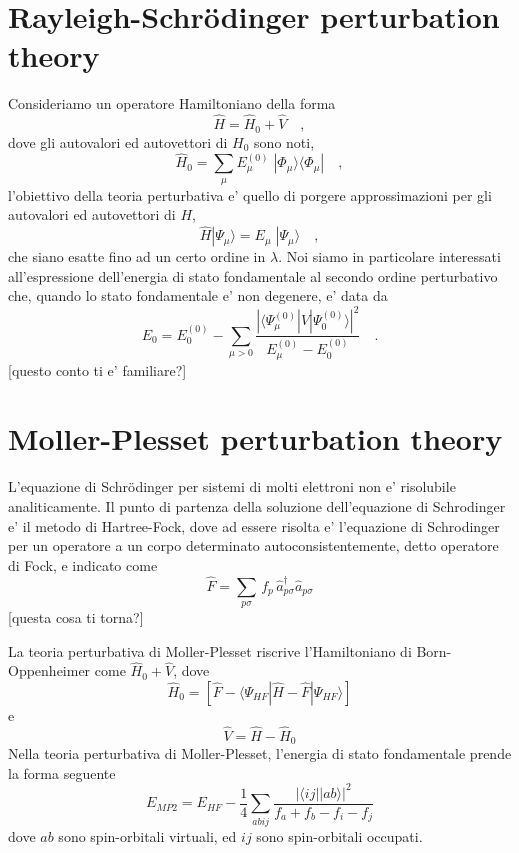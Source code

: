\documentclass{report}
\begin{document}
\section{Rayleigh-Schr\"{o}dinger perturbation theory}

Consideriamo un operatore Hamiltoniano della forma
\begin{equation}
\hat{H} = \hat{H}_0 + \hat{V}
\quad,
\end{equation}
dove gli autovalori ed autovettori di $H_0$ sono noti,
\begin{equation}
\hat{H}_0 = \sum_\mu E^{(0)}_{\mu} \; | \Phi_\mu \rangle \langle \Phi_\mu |
\quad,
\end{equation}
l'obiettivo della teoria perturbativa e' quello di porgere approssimazioni per gli autovalori ed autovettori di $H$,
\begin{equation}
\hat{H} | \Psi_\mu \rangle = E_\mu \; | \Psi_\mu \rangle
\quad,
\end{equation}
che siano esatte fino ad un certo ordine in $\lambda$. 
Noi siamo in particolare interessati all'espressione dell'energia di stato fondamentale al secondo ordine perturbativo che,
quando lo stato fondamentale e' non degenere, e' data da 
\begin{equation}
E_0 = E^{(0)}_{0} - \sum_{\mu>0} \frac{ | \langle \Psi_\mu^{(0)} | \hat{V} | \Psi_0^{(0)} \rangle |^2 }{ E^{(0)}_{\mu} - E^{(0)}_{0} }
\quad.
\end{equation}
[questo conto ti e' familiare?]

\section{Moller-Plesset perturbation theory}

L'equazione di Schr\"{o}dinger per sistemi di molti elettroni non e' risolubile analiticamente. 
Il punto di partenza della soluzione dell'equazione di Schrodinger e' il metodo di Hartree-Fock, dove ad essere risolta e'
l'equazione di Schrodinger per un operatore a un corpo determinato autoconsistentemente, detto operatore di Fock, e indicato come
\begin{equation}
\hat{F} = \sum_{p \sigma} \, f_p \, \hat{a}_{p\sigma}^\dagger \hat{a}_{p\sigma}
\end{equation}
[questa cosa ti torna?]

La teoria perturbativa di Moller-Plesset riscrive l'Hamiltoniano di Born-Oppenheimer come $\hat{H}_0 + \hat{V}$, dove 
\begin{equation}
\hat{H}_0 = \left[ \hat{F} - \langle \Psi_{HF} | \hat{H} - \hat{F} | \Psi_{HF} \rangle \right]
\end{equation}
e
\begin{equation}
\hat{V} = \hat{H} - \hat{H}_0
\end{equation}
Nella teoria perturbativa di Moller-Plesset, l'energia di stato fondamentale prende la forma seguente
\begin{equation}
E_{MP2} = E_{HF} - \frac{1}{4} \sum_{abij} \frac{ | \langle ij || ab \rangle |^2 }{f_a + f_b - f_i - f_j}
\end{equation}
dove $ab$ sono spin-orbitali virtuali, ed $ij$ sono spin-orbitali occupati.
\end{document}
